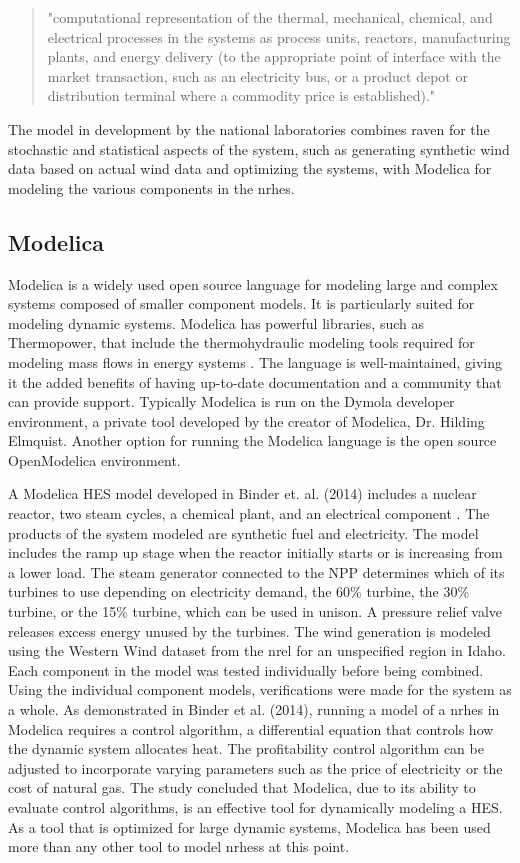 \begin{quotation}
"computational representation of the thermal, mechanical, chemical, and electrical processes in the systems as process units, reactors, manufacturing plants, and energy delivery (to the appropriate point of interface with the market transaction, such as an electricity bus, or a product depot or distribution terminal where a commodity price is established)\cite{Rabiti2015}."
\end{quotation}

The model in development by the national laboratories combines \ac{raven} for the stochastic and statistical aspects of the system, such as generating synthetic wind data based on actual wind data and optimizing the systems, with Modelica for modeling the various components in the \ac{nrhes}.

\subsection{Modelica}
Modelica is a widely used open source language for modeling large and complex systems composed of smaller component models. It is particularly suited for modeling dynamic systems. Modelica has powerful libraries, such as Thermopower, that include the thermohydraulic modeling tools required for modeling mass flows in energy systems \cite{Binder2014}. The language is well-maintained, giving it the added benefits of having up-to-date documentation and a community that can provide support. Typically Modelica is run on the Dymola developer environment, a private tool developed by the creator of Modelica, Dr. Hilding Elmquist. Another option for running the Modelica language is the open source OpenModelica environment.

A Modelica HES model developed in Binder et. al. (2014) includes a nuclear reactor, two steam cycles, a chemical plant, and an electrical component \cite{Binder2014}. The products of the system modeled are synthetic fuel and electricity. The model includes the ramp up stage when the reactor initially starts or is increasing from a lower load. The steam generator connected to the NPP determines which of its turbines to use depending on electricity demand, the 60\% turbine, the 30\% turbine, or the 15\% turbine, which can be used in unison. A pressure relief valve releases excess energy unused by the turbines. The wind generation is modeled using the Western Wind dataset from the \ac{nrel} for an unspecified region in Idaho. Each component in the model was tested individually before being combined. Using the individual component models, verifications were made for the system as a whole. As demonstrated in Binder et al. (2014), running a model of a \ac{nrhes} in Modelica requires a control algorithm, a differential equation that controls how the dynamic system allocates heat. The profitability control algorithm can be adjusted to incorporate varying parameters such as the price of electricity or the cost of natural gas. The study concluded that Modelica, due to its ability to evaluate control algorithms, is an effective tool for dynamically modeling a HES. As a tool that is optimized for large dynamic systems, Modelica has been used more than any other tool to model \ac{nrhess} at this point.


